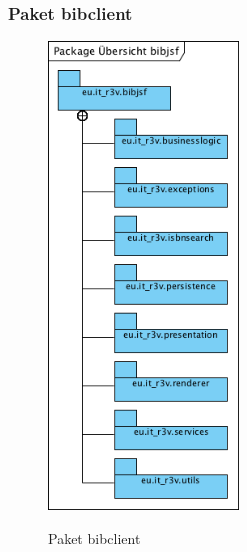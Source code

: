 \documentclass[fontsize=12pt,paper=a4,twoside]{scrartcl}
\begin{document}
\subsubsection{Paket bibclient}
\label{sec:bibclient}

\begin{figure} [H] 
\caption{Paket bibclient} \centering
	\includegraphics[width=0.45\textwidth]{Diagramme/Packagebibjsfuebersicht.png} 
	\label{pic:PackagebibjsfUebersicht} 
\end{figure}
\end{document}
